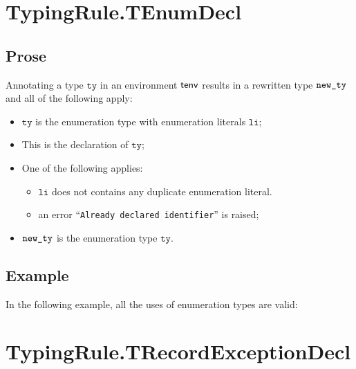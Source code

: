 \documentclass{book}
\newcommand\tty[0]{\texttt{ty}}
\newcommand\vli[0]{\texttt{li}}
\begin{document}
\section{TypingRule.TEnumDecl \label{sec:TypingRule.TEnumDecl}}

\subsection{Prose}
Annotating a type $\tty$ in an environment $\textsf{tenv}$ results in a
rewritten type $\texttt{new\_ty}$ and all of the following apply:
\begin{itemize}
  \item $\tty$ is the enumeration type with enumeration literals
    $\vli$;
  \item This is the declaration of $\tty$;
  \item One of the following applies:
    \begin{itemize}
      \item $\vli$ does not contains any duplicate enumeration literal.
      \item an error ``\texttt{Already declared identifier}'' is raised;
    \end{itemize}
  \item $\texttt{new\_ty}$ is the enumeration type $\tty$.
\end{itemize}

\subsection{Example}
In the following example, all the uses of enumeration types are valid:







\section{TypingRule.TRecordExceptionDecl \label{sec:TypingRule.TRecordExceptionDecl}}
\end{document}
